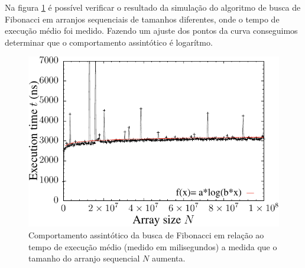 Na figura \ref{fig:fibsearch_time} é possível verificar o resultado da simulação do algoritmo de busca de Fibonacci em arranjos sequenciais de tamanhos diferentes, onde o tempo de execução médio foi medido. Fazendo um ajuste dos pontos da curva conseguimos determinar que o comportamento assintótico é logarítmo.
\begin{figure}[H]
  \centering
  \includegraphics[scale=1.2]{../plots/fibsearch_time.pdf}
  \caption{Comportamento assintótico da busca de Fibonacci em relação ao tempo de execução médio (medido em milisegundos) a medida que o tamanho do arranjo sequencial $N$ aumenta.}
  \label{fig:fibsearch_time}
\end{figure} 
